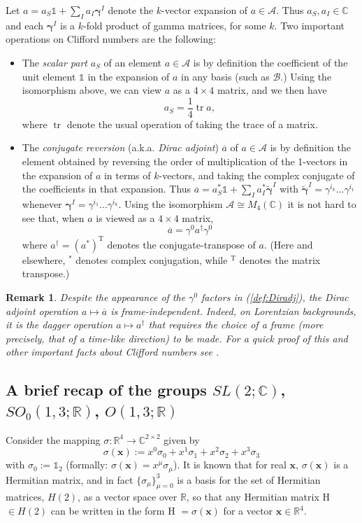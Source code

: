 \documentclass[11pt]{article}
\theoremstyle{definition}
\newtheorem{rem}[thm]{Remark}
\DeclareMathOperator{\tr}{tr}
\newcommand{\refeq}[1]{(\ref{#1})}
\numberwithin{equation}{section}
\newcommand{\bx}{\mathbf{x}}
\newcommand{\beq}{\begin{equation}}
\newcommand{\eeq}{\end{equation}}
\newcommand{\Id}{\mathds{1}}
\newcommand{\cA}{\mathcal{A}}
\newcommand{\cB}{\mathcal{B}}
\newcommand{\Cset}{{\mathbb C}}
\newcommand{\Rset}{{\mathbb R}}
\newcommand{\ga}{\gamma}
\newcommand{\bga}{\boldsymbol{\gamma}}
\newcommand{\si}{\sigma}
\begin{document}
 Let $a = a_S \Id +\sum_I a_I \bga^I$ denote the $k$-vector expansion of $a\in \cA$. 
 Thus $a_S,a_I\in \Cset$ and each $\bga^I$ is a $k$-fold product of gamma matrices, for some $k$. 
 Two important operations on Clifford numbers are the following:  
\begin{itemize}
\item 
The {\em scalar part} $a_S$ of an element $a \in \cA$ is by definition the coefficient of the unit element $\Id$ in the expansion of $a$ in 
any basis (such as $\cB$.)  
Using the isomorphism above, we can view $a$ as a $4\times 4$ matrix, and we then have
\beq 
a_S = \frac{1}{4}\tr a,
\eeq
where $\tr$ denote the usual operation of taking the trace of a matrix.
\item 
The {\em conjugate reversion} (a.k.a. {\em Dirac adjoint}) $\overline{a}$ of  $a\in\cA$ is by definition the element 
obtained by reversing the order of multiplication of the 1-vectors in the expansion of $a$ in terms of $k$-vectors, 
and taking the complex conjugate of the coefficients in that expansion. 
 Thus
$
\overline{a} = a_S^* \Id + \sum_I a_I^* \tilde{\bga}^I 
$
with $\tilde{\bga}^I = \ga^{i_k}\dots\ga^{i_1}$ whenever $\bga^I = \ga^{i_1}\dots\ga^{i_k}$. 
 Using the isomorphism $\cA \cong M_4(\Cset)$ it is not hard to see that, when $a$ is viewed as a $4\times 4$ matrix,
\beq\label{def:Diradj}
\overline{a} = \ga^0 a^\dag \ga^0
\eeq
where $a^\dag = (a^*)^{\mathrm{T}}$ denotes the conjugate-transpose of $a$. 
(Here and elsewhere, ${}^\ast$ denotes complex conjugation, while ${}^{\mathrm{T}}$ denotes the matrix transpose.)
\end{itemize}
\begin{rem}\label{rem:diradj}
\textit{Despite the appearance of the $\ga^0$ factors in \refeq{def:Diradj}, the Dirac adjoint operation $a\mapsto \overline{a}$ 
is frame-independent.
  Indeed, on Lorentzian backgrounds, it is the dagger operation $a \mapsto a^\dag$ that requires the choice of a frame (more precisely,
 that of a time-like direction) to be made. 
 For a quick proof of this and other important facts about Clifford numbers see \cite{Rie1946}.}
\end{rem}


\subsection{A brief recap of the groups $SL(2;\Cset)$, $SO_0(1,3;\Rset)$, $O(1,3;\Rset)$}
\label{sec:LorentzRep}
 Consider the mapping $\si :\Rset^4 \to \Cset^{2\times 2}$ given by
\beq \label{def:si}
\si(\bx) := x^0 \si_0 + x^1\si_1 + x^2\si_2 + x^3 \si_3 
\eeq
with $\si_0 := \mathds{1}_2$ (formally:
$\si(\bx) = x^\mu \si_\mu$).
  It is known that for real $\bx$, $\si(\bx)$ is a Hermitian matrix, and in fact $\{\si_\mu\}_{\mu=0}^3$ is a basis for the set of
Hermitian matrices, $H(2)$, as a vector space over $\Rset$, so that any Hermitian matrix H $\in H(2)$ can be written in the form
H $=\sigma(\bx)$ for a vector $\bx\in\Rset^4$.  
\end{document}
